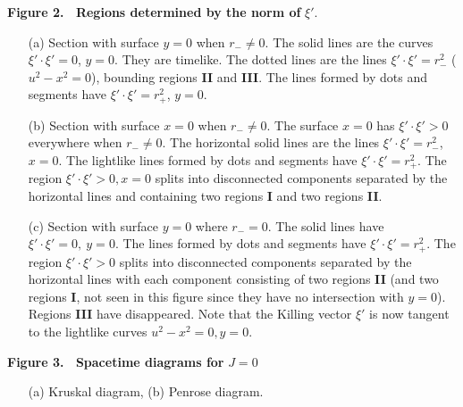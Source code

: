 \noindent
{\bf Figure 2. \ Regions determined by the norm of} $\xi'$.
\begin{enumerate}
\item[(a)]  Section with surface $y=0$ when $r_- \not= 0$. The solid
lines are the curves $\xi'\cdot \xi' =0$, $y=0$. %
They are timelike. The dotted lines
are the lines $\xi'\cdot\xi' =r_{-}^2$ ($u^2-x^2=0$), %
bounding regions {\bf II} and {\bf III}. The lines formed by dots and segments
 have
$\xi'\cdot \xi'=r_{+}^2$, $y=0$.

\item[(b)] Section with surface $x=0$ when $r_- \not= 0$.
The surface $x=0$ has $\xi'\cdot\xi' > 0$ everywhere when $r_- \not= 0$.  The
 horizontal solid lines are the lines $\xi'\cdot \xi'=r_{-}^2$, $x = 0$. The
 lightlike lines formed by dots and segments have $\xi'\cdot \xi'=r_{+}^2$.
The region
$\xi' \cdot \xi' > 0, x = 0$ splits into disconnected components separated by
 the horizontal lines and containing two regions {\bf I} and two regions {\bf
 II}.

\item[(c)] Section with surface $y=0$ where $r_-=0$. The solid lines
 have $\xi' \cdot \xi' = 0, \ y = 0$. The lines formed by dots and segments
have $\xi' \cdot \xi' = r_+^2$.  The region $\xi'\cdot\xi' > 0$ splits into
 disconnected
components separated by the horizontal lines with each component consisting of
 two regions {\bf II} (and two regions {\bf I}, not seen in this figure since
 they have no intersection with $y=0$). Regions {\bf III} have disappeared.
Note that the Killing vector $\xi'$ is now tangent to the lightlike curves
$u^2-x^2 = 0, y = 0$.
\end{enumerate}
\bigskip
\noindent
{\bf Figure 3. \ Spacetime diagrams for} $J=0$
\begin{enumerate}
\item[(a)] Kruskal diagram,  (b) Penrose diagram.
\end{enumerate}
